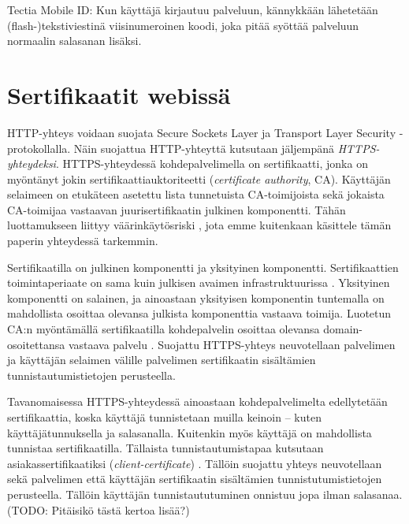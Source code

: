 \documentclass[english,gradu]{tktltiki}
\begin{document}
Tectia Mobile ID: Kun käyttäjä kirjautuu palveluun, kännykkään lähetetään (flash-)tekstiviestinä viisinumeroinen koodi, joka pitää syöttää palveluun normaalin salasanan lisäksi.




\section{Sertifikaatit webissä} %
\label{sec:sertifikaatit_webissä}


%

HTTP-yhteys voidaan suojata Secure Sockets Layer ja Transport Layer Security -protokollalla. Näin suojattua HTTP-yhteyttä kutsutaan jäljempänä \emph{HTTPS-yhteydeksi}. HTTPS-yhteydessä kohdepalvelimella on sertifikaatti, jonka on myöntänyt jokin sertifikaattiauktoriteetti (\emph{certificate authority}, CA). Käyttäjän selaimeen on etukäteen asetettu lista tunnetuista CA-toimijoista sekä jokaista CA-toimijaa vastaavan juurisertifikaatin julkinen komponentti. Tähän luottamukseen liittyy väärinkäytösriski \cite{certified_lies, eff_ssliverse}, jota emme kuitenkaan käsittele tämän paperin yhteydessä tarkemmin.

Sertifikaatilla on julkinen komponentti ja yksityinen komponentti.
Sertifikaattien toimintaperiaate on sama kuin julkisen avaimen infrastruktuurissa \cite{nist_pki_intro, henry_story_foaf_ssl}.
Yksityinen komponentti on salainen, ja ainoastaan yksityisen komponentin tuntemalla on mahdollista osoittaa olevansa julkista komponenttia vastaava toimija. Luotetun CA:n myöntämällä sertifikaatilla kohdepalvelin osoittaa olevansa domain-osoitettansa vastaava palvelu \cite{authenticated_names}.
Suojattu HTTPS-yhteys neuvotellaan palvelimen ja käyttäjän selaimen välille palvelimen sertifikaatin sisältämien tunnistautumistietojen perusteella.

Tavanomaisessa HTTPS-yhteydessä ainoastaan kohdepalvelimelta edellytetään sertifikaattia, koska käyttäjä tunnistetaan muilla keinoin -- kuten käyttäjätunnuksella ja salasanalla.
Kuitenkin myös käyttäjä on mahdollista tunnistaa sertifikaatilla. Tällaista tunnistautumistapaa kutsutaan asiakassertifikaatiksi (\emph{client-certificate}) \cite{henry_story_foaf_ssl}.
Tällöin suojattu yhteys neuvotellaan sekä palvelimen että käyttäjän sertifikaatin sisältämien tunnistutumistietojen perusteella.
Tällöin käyttäjän tunnistaututuminen onnistuu jopa ilman salasanaa. (TODO: Pitäisikö tästä kertoa lisää?)
\end{document}
